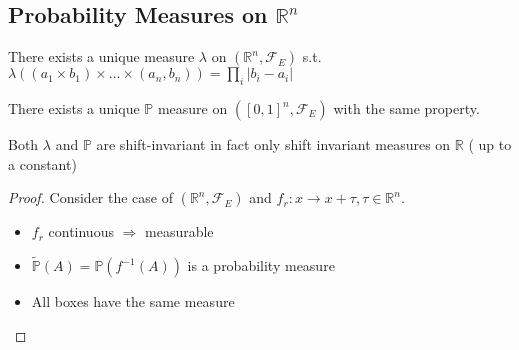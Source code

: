 \documentclass[../main.tex]{subfiles}
\begin{document}
\subsection{Probability Measures on $\mathbb{R}^{n}$ }
\begin{thm}
	There exists a unique measure $\lambda$ on $ ( \mathbb{R}^n, \mathcal{F}_E) $ s.t. $ \lambda( ( a_1\times b_1) \times \ldots \times ( a_n,b_n) ) = \prod_i |b_i-a_i|$ 
\end{thm}
\begin{thm}
	There exists a unique $ \mathbb{P}$ measure on $( [ 0,1]^{n}, \mathcal{F}_E) $ with the same property.
\end{thm}
Both $\lambda$ and $ \mathbb{P}$ are shift-invariant in fact only shift invariant measures on $ \mathbb{R}$ ( up to a constant) 
\begin{proof}
	Consider the case of $ ( \mathbb{R}^n, \mathcal{F}_E) $ and $ f_r: x \to x+\tau,\tau \in \mathbb{R}^n$.
	\begin{itemize}
	\item $f_r$ continuous $\Rightarrow$ measurable
	\item $\tilde { \mathbb{P}} ( A) = \mathbb{P}( f^{-1}( A) ) $ is a probability measure
	\item All boxes have the same measure
	\end{itemize}
	
\end{proof}
\end{document}

